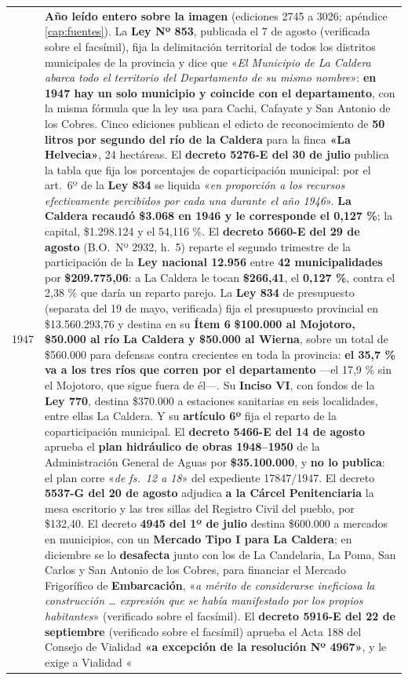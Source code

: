 \begin{longtable}{@{}p{2.7cm}p{10.3cm}@{}}
1947 & \textbf{Año leído entero sobre la imagen} (ediciones 2745 a 3026; apéndice \ref{cap:fuentes}). La \textbf{Ley Nº 853}, publicada el 7 de agosto (verificada sobre el facsímil), fija la delimitación territorial de todos los distritos municipales de la provincia y dice que «\textit{El Municipio de La Caldera abarca todo el territorio del Departamento de su mismo nombre}»: \textbf{en 1947 hay un solo municipio y coincide con el departamento}, con la misma fórmula que la ley usa para Cachi, Cafayate y San Antonio de los Cobres. Cinco ediciones publican el edicto de reconocimiento de \textbf{50 litros por segundo del río de la Caldera} para la finca \textbf{«La Helvecia»}, 24 hectáreas. El \textbf{decreto 5276-E del 30 de julio} publica la tabla que fija los porcentajes de coparticipación municipal: por el art.\ 6º de la \textbf{Ley 834} se liquida «\textit{en proporción a los recursos efectivamente percibidos por cada una durante el año 1946}». \textbf{La Caldera recaudó \$3.068 en 1946 y le corresponde el 0,127 \%}; la capital, \$1.298.124 y el 54,116 \%. El \textbf{decreto 5660-E del 29 de agosto} (B.O.\ Nº 2932, h.\ 5) reparte el segundo trimestre de la participación de la \textbf{Ley nacional 12.956} entre \textbf{42 municipalidades} por \textbf{\$209.775,06}: a La Caldera le tocan \textbf{\$266,41}, el \textbf{0,127 \%}, contra el 2,38 \% que daría un reparto parejo. La \textbf{Ley 834} de presupuesto (separata del 19 de mayo, verificada) fija el presupuesto provincial en \$13.560.293,76 y destina en su \textbf{Ítem 6} \textbf{\$100.000 al Mojotoro, \$50.000 al río La Caldera y \$50.000 al Wierna}, sobre un total de \$560.000 para defensas contra crecientes en toda la provincia: \textbf{el 35,7 \% va a los tres ríos que corren por el departamento} ---el 17,9 \% sin el Mojotoro, que sigue fuera de él---. Su \textbf{Inciso VI}, con fondos de la \textbf{Ley 770}, destina \$370.000 a estaciones sanitarias en seis localidades, entre ellas La Caldera. Y su \textbf{artículo 6º} fija el reparto de la coparticipación municipal. El \textbf{decreto 5466-E del 14 de agosto} aprueba el \textbf{plan hidráulico de obras 1948--1950} de la Administración General de Aguas por \textbf{\$35.100.000}, y \textbf{no lo publica}: el plan corre «\textit{de fs.\ 12 a 18}» del expediente 17847/1947. El decreto \textbf{5537-G del 20 de agosto} adjudica \textbf{a la Cárcel Penitenciaria} la mesa escritorio y las tres sillas del Registro Civil del pueblo, por \$132,40. El decreto \textbf{4945 del 1º de julio} destina \$600.000 a mercados en municipios, con un \textbf{Mercado Tipo I para La Caldera}; en diciembre se lo \textbf{desafecta} junto con los de La Candelaria, La Poma, San Carlos y San Antonio de los Cobres, para financiar el Mercado Frigorífico de \textbf{Embarcación}, «\textit{a mérito de considerarse ineficiosa la construcción \ldots{} expresión que se había manifestado por los propios habitantes}» (verificado sobre el facsímil). El \textbf{decreto 5916-E del 22 de septiembre} (verificado sobre el facsímil) aprueba el Acta 188 del Consejo de Vialidad \textbf{«a excepción de la resolución Nº 4967»}, y le exige a Vialidad «\textit{informar en mérito a qué consideraciones ha sido incluido, \textbf{fuera del plan}, el camino denominado «La Caldera 
\end{longtable}
